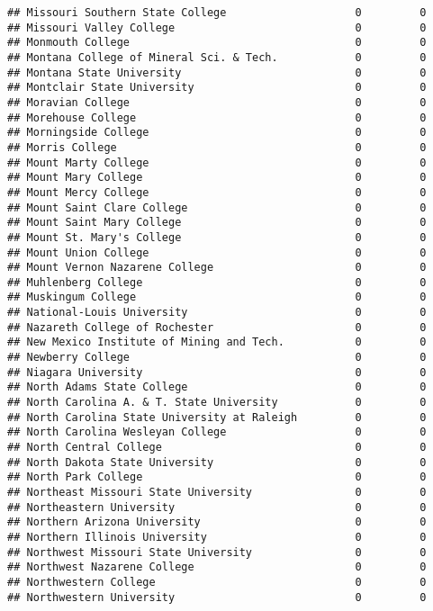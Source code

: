 \documentclass[
]{article}
\begin{document}
\begin{verbatim}
## Missouri Southern State College                    0         0
## Missouri Valley College                            0         0
## Monmouth College                                   0         0
## Montana College of Mineral Sci. & Tech.            0         0
## Montana State University                           0         0
## Montclair State University                         0         0
## Moravian College                                   0         0
## Morehouse College                                  0         0
## Morningside College                                0         0
## Morris College                                     0         0
## Mount Marty College                                0         0
## Mount Mary College                                 0         0
## Mount Mercy College                                0         0
## Mount Saint Clare College                          0         0
## Mount Saint Mary College                           0         0
## Mount St. Mary's College                           0         0
## Mount Union College                                0         0
## Mount Vernon Nazarene College                      0         0
## Muhlenberg College                                 0         0
## Muskingum College                                  0         0
## National-Louis University                          0         0
## Nazareth College of Rochester                      0         0
## New Mexico Institute of Mining and Tech.           0         0
## Newberry College                                   0         0
## Niagara University                                 0         0
## North Adams State College                          0         0
## North Carolina A. & T. State University            0         0
## North Carolina State University at Raleigh         0         0
## North Carolina Wesleyan College                    0         0
## North Central College                              0         0
## North Dakota State University                      0         0
## North Park College                                 0         0
## Northeast Missouri State University                0         0
## Northeastern University                            0         0
## Northern Arizona University                        0         0
## Northern Illinois University                       0         0
## Northwest Missouri State University                0         0
## Northwest Nazarene College                         0         0
## Northwestern College                               0         0
## Northwestern University                            0         0

\end{verbatim}
\end{document}
